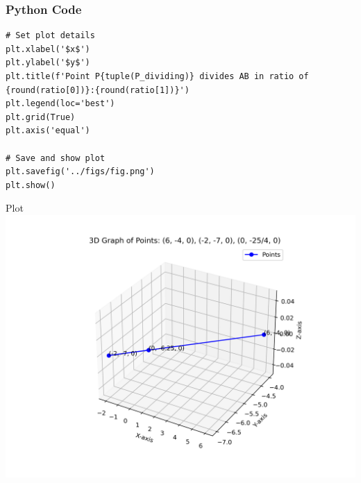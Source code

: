 \documentclass{beamer}
\begin{document}
\begin{frame}[fragile]
    \frametitle{Python Code}
    \begin{lstlisting}
# Set plot details
plt.xlabel('$x$')
plt.ylabel('$y$')
plt.title(f'Point P{tuple(P_dividing)} divides AB in ratio of {round(ratio[0])}:{round(ratio[1])}')
plt.legend(loc='best')
plt.grid(True)
plt.axis('equal')

# Save and show plot
plt.savefig('../figs/fig.png')
plt.show()
  \end{lstlisting}
    \end{frame}

\begin{frame}{Plot}
    \centering
    \includegraphics[width=\columnwidth, height=0.8\textheight, keepaspectratio]{../figs/graph3d.png}     
\end{frame}
\end{document}
